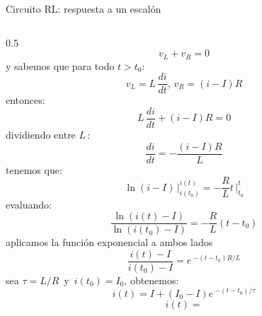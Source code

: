 \documentclass[aspectratio=169]{beamer}
\begin{document}
\begin{frame}{Circuito RL: respuesta a un escalón}
\begin{columns}[onlytextwidth]
\begin{column}{0.5\textwidth}
{{            \begin{equation*}
                v_L + v_R = 0
            \end{equation*}
            }
            {y sabemos que para todo $t>t_0$: 
            \begin{equation*}
                v_L = L\,\dfrac{di}{dt},\, v_R=(i-I)R
            \end{equation*}
            }
            {entonces:
            \begin{equation*}
                L\,\dfrac{di}{dt} + (i-I)R = 0
            \end{equation*}
            }
        }
            {
            {dividiendo entre $L\,$:
            \begin{equation*}
                \dfrac{di}{dt} = -\dfrac{(i-I)R}{L}
            \end{equation*}
            }
        }
            {
            {tenemos que:
            \begin{equation*}
                \ln(i-I)\,\bigg|_{i(t_0)}^{i(t)} = -\frac{R}{L}t\,\bigg|_{t_0}^{t}
            \end{equation*}
            }
            {evaluando:
            \begin{equation*}
                \dfrac{\ln(i(t)-I)}{\ln (i(t_0)-I)} = -\frac{R}{L}(t - t_0)
            \end{equation*}
            }
        }
            {
            {aplicamos la función exponencial a ambos lados
            \begin{equation*}
                \dfrac{i(t)-I}{i(t_0)-I} = e\,^{-(t - t_0)R/L}
            \end{equation*}
            }
            {sea $\tau=L/R\,$ y $\,i(t_0) = I_0$, obtenemos:
            \begin{equation*}
                i(t)=I + (I_0-I)e\,^{-(t - t_0)/ \tau}
            \end{equation*}
            }
        }
            {
            {\begin{equation*}
                i(t) =

\end{equation*}}}
\end{column}
\end{columns}
\end{frame}
\end{document}
